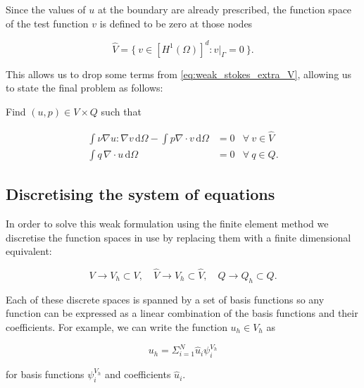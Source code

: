 \documentclass[thesis]{subfiles}
\begin{document}
Since the values of $u$ at the boundary are already prescribed, the function space of the test function $v$ is defined to be zero at those nodes

\begin{equation*}
  \hat V = \{\ v \in [H^1(\Omega)]^d : v|_{\Gamma} = 0 \ \}.
\end{equation*}

This allows us to drop some terms from \cref{eq:weak_stokes_extra_V}, allowing us to state the final problem as follows:

\vspace{1em}

Find $(u, p) \in V \times Q$ such that

\begin{subequations}
  \begin{align}
    \int \nu \nabla u : \nabla v \, \textrm{d}\Omega
    - \int p \nabla \cdot v \, \textrm{d}\Omega
    &= 0
    &\forall \ v \in \hat V
    \label{eq:weak_stokes_V} \\
    \int q \, \nabla \cdot u \, \textrm{d}\Omega
    &= 0
    &\forall \ q \in Q.
    \label{eq:weak_stokes_Q}
  \end{align}
  \label{eq:weak_stokes}
\end{subequations}

\subsection{Discretising the system of equations}

In order to solve this weak formulation using the finite element method we discretise the function spaces in use by replacing them with a finite dimensional equivalent:

\begin{equation*}
  V \to V_h \subset V,
  \quad
  \hat V \to \hat V_h \subset \hat V,
  \quad
  Q \to Q_h \subset Q.
\end{equation*}

Each of these discrete spaces is spanned by a set of basis functions so any function can be expressed as a linear combination of the basis functions and their coefficients.
For example, we can write the function $u_h \in V_h$ as

\begin{equation*}
  u_h = \Sigma^N_{i=1} \hat u_i \psi^{V_h}_i
\end{equation*}

for basis functions $\psi^{V_h}_i$ and coefficients $\hat u_i$.
\end{document}
